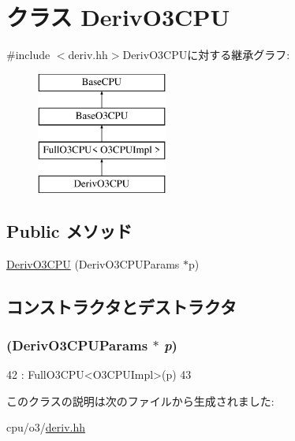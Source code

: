 \hypertarget{classDerivO3CPU}{
\section{クラス DerivO3CPU}
\label{classDerivO3CPU}
}


{\ttfamily \#include $<$deriv.hh$>$}DerivO3CPUに対する継承グラフ:\begin{figure}[H]
\begin{center}
\leavevmode
\includegraphics[height=4cm]{classDerivO3CPU}
\end{center}
\end{figure}
\subsection*{Public メソッド}
\begin{DoxyCompactItemize}
\item 
\hyperlink{classDerivO3CPU_a4b1665716087fcd74e6892458e3e9e89}{DerivO3CPU} (DerivO3CPUParams $\ast$p)
\end{DoxyCompactItemize}


\subsection{コンストラクタとデストラクタ}
\hypertarget{classDerivO3CPU_a4b1665716087fcd74e6892458e3e9e89}{
\subsubsection[{DerivO3CPU}]{ (DerivO3CPUParams $\ast$ {\em p})}}
\label{classDerivO3CPU_a4b1665716087fcd74e6892458e3e9e89}



\begin{DoxyCode}
42         : FullO3CPU<O3CPUImpl>(p)
43     { }
\end{DoxyCode}


このクラスの説明は次のファイルから生成されました:\begin{DoxyCompactItemize}
\item 
cpu/o3/\hyperlink{deriv_8hh}{deriv.hh}\end{DoxyCompactItemize}
